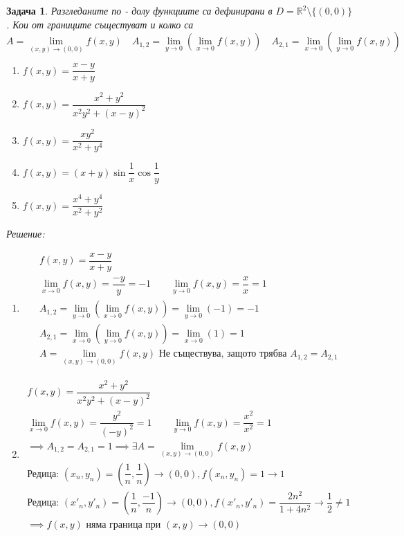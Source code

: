 \documentclass[a4paper,fleqn,12pt]{article}
\newtheorem{task}{Задача}[section]
\begin{document}
\begin{task}
Разгледаните по - долу функциите са дефинирани в $D = \mathbb{R}^2 \setminus \{ (0,0) \}$. Кои от границите същестуват и колко са
$$
A = \lim\limits_{(x,y) \to (0,0)} f(x,y) \quad
A_{1,2} = \lim\limits_{y \to 0} \left( \lim\limits_{x \to 0} f(x,y) \right) \quad
A_{2,1} = \lim\limits_{x \to 0} \left( \lim\limits_{y \to 0} f(x,y) \right) \quad
$$

\begin{enumerate}

\item $f(x,y) = \dfrac{x-y}{x+y}$
\item $f(x,y) = \dfrac{x^2 + y^2}{x^2y^2 + (x - y)^2}$
\item $f(x,y) = \dfrac{xy^2}{x^2+y^4}$
\item $f(x,y) = (x+y) \sin{\dfrac{1}{x}} \cos{\dfrac{1}{y}}$
\item $f(x,y) = \dfrac{x^4 + y^4}{x^2 + y^2}$

\end{enumerate}
Решение: 

\begin{enumerate}

\item 
\begin{gather*}
f(x,y) = \dfrac{x-y}{x+y} \\
\lim\limits_{x \to 0} f(x,y) = \dfrac{-y}{y} = -1 \qquad 
\lim\limits_{y \to 0} f(x,y) = \dfrac{x}{x} = 1 \\
A_{1,2} = \lim\limits_{y \to 0} \left( \lim\limits_{x \to 0} f(x,y) \right) = \lim\limits_{y \to 0} \left( -1 \right) = -1\\
A_{2,1} = \lim\limits_{x \to 0} \left( \lim\limits_{y \to 0} f(x,y) \right) = \lim\limits_{x \to 0} \left( 1 \right) = 1 \\
A = \lim\limits_{(x,y) \to (0,0)} f(x,y) \text{ Не съществува, защото трябва }A_{1,2} = A_{2,1}
\end{gather*}

\item 
\begin{gather*}
f(x,y) = \dfrac{x^2 + y^2}{x^2y^2 + (x - y)^2}\\
\lim\limits_{x \to 0} f(x,y) = \dfrac{y^2}{(-y)^2} = 1 \qquad 
\lim\limits_{y \to 0} f(x,y) = \dfrac{x^2}{x^2} = 1 \\
\implies A_{1,2} = A_{2,1} = 1 \implies \exists A = \lim\limits_{(x,y) \to (0,0)} f(x,y)\\
\text{Редица: }(x_n, y_n) = (\dfrac{1}{n},\dfrac{1}{n}) \to (0,0), f(x_n, y_n) = 1 \to 1\\
\text{Редица: }(x'_n, y'_n) = (\dfrac{1}{n},\dfrac{-1}{n})  \to (0,0), f(x'_n, y'_n) = \dfrac{2n^2}{1 + 4n^2} \to \dfrac{1}{2} \neq 1 \\
\implies f(x,y) \text{ няма граница при } (x,y) \to (0,0)
\end{gather*}


\end{enumerate}
\end{task}
\end{document}
